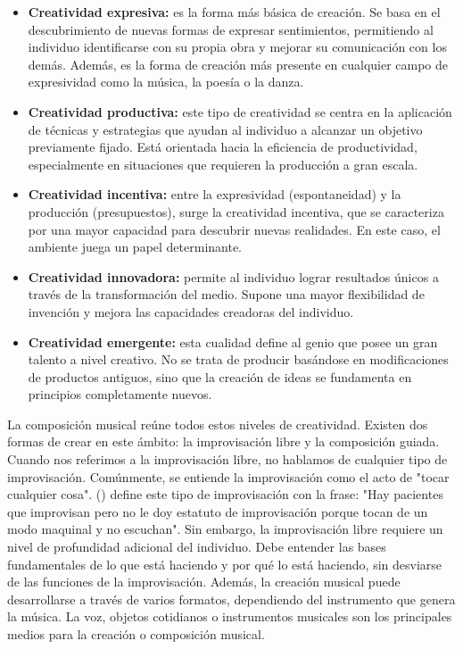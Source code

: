 \begin{itemize}
	\item \textbf{Creatividad expresiva:} es la forma más básica de creación. Se basa en el descubrimiento de nuevas formas de expresar sentimientos, permitiendo al individuo identificarse con su propia obra y mejorar su comunicación con los demás. Además, es la forma de creación más presente en cualquier campo de expresividad como la música, la poesía o la danza. 
	\item \textbf{Creatividad productiva:} este tipo de creatividad se centra en la aplicación de técnicas y estrategias que ayudan al individuo a alcanzar un objetivo previamente fijado. Está orientada hacia la eficiencia de productividad, especialmente en situaciones que requieren la producción a gran escala.
	\item \textbf{Creatividad incentiva:} entre la expresividad (espontaneidad) y la producción (presupuestos), surge la creatividad incentiva, que se caracteriza por una mayor capacidad para descubrir nuevas realidades. En este caso, el ambiente juega un papel determinante.
	\item \textbf{Creatividad innovadora:} permite al individuo lograr resultados únicos a través de la transformación del medio. Supone una mayor flexibilidad de invención y mejora las capacidades creadoras del individuo.
	\item \textbf{Creatividad emergente:} esta cualidad define al genio que posee un gran talento a nivel creativo. No se trata de producir basándose en modificaciones de productos antiguos, sino que la creación de ideas se fundamenta en principios completamente nuevos.
\end{itemize}

La composición musical reúne todos estos niveles de creatividad. Existen dos formas de crear en este ámbito: la improvisación libre y la composición guiada. Cuando nos referimos a la improvisación libre, no hablamos de cualquier tipo de improvisación. Comúnmente, se entiende la improvisación como el acto de "tocar cualquier cosa". \citeauthor{OLMEDO:2014} (\citeyear{OLMEDO:2014}) define este tipo de improvisación con la frase: "Hay pacientes que improvisan pero no le doy estatuto de improvisación porque tocan de un modo maquinal y no escuchan". Sin embargo, la improvisación libre requiere un nivel de profundidad adicional del individuo. Debe entender las bases fundamentales de lo que está haciendo y por qué lo está haciendo, sin desviarse de las funciones de la improvisación. Además, la creación musical puede desarrollarse a través de varios formatos, dependiendo del instrumento que genera la música. La voz, objetos cotidianos o instrumentos musicales son los principales medios para la creación o composición musical.

